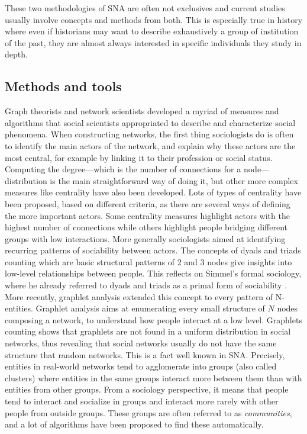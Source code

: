 These two methodologies of SNA are often not exclusives and current studies usually involve concepts and methods from both.
This is especially true in history where even if historians may want to describe exhaustively a group of institution of the past, they are almost always interested in specific individuals they study in depth.

\subsection{Methods and tools}\label{subsec:methods-dans-tools}

Graph theorists and network scientists developed a myriad of measures and algorithms that social scientists appropriated to describe and characterize social phenomena.
When constructing networks, the first thing sociologists do is often to identify the main actors of the network, and explain why these actors are the most central, for example by linking it to their profession or social status.
Computing the degree---which is the number of connections for a node---distribution is the main straightforward way of doing it, but other more complex measures like centrality have also been developed.
Lots of types of centrality have been proposed, based on different criteria, as there are several ways of defining the more important actors.
Some centrality measures highlight actors with the highest number of connections while others highlight people bridging different groups with low interactions.
More generally sociologists aimed at identifying recurring patterns of sociability between actors.
The concepts of dyads and triads counting which are basic structural patterns of 2 and 3 nodes give insights into low-level relationships between people.
This reflects on Simmel's formal sociology, where he already referred to dyads and triads as a primal form of sociability \cite{Simmel2013}.
More recently, graphlet analysis extended this concept to every pattern of N-entities.
Graphlet analysis aims at enumerating every small structure of $N$ nodes composing a network, to understand how people interact at a low level.
Graphlets counting shows that graphlets are not found in a uniform distribution in social networks, thus revealing that social networks usually do not have the same structure that random networks.
This is a fact well known in SNA. Precisely, entities in real-world networks tend to agglomerate into groups (also called clusters) where entities in the same groups interact more between them than with entities from other groups.
From a sociology perspective, it means that people tend to interact and socialize in groups and interact more rarely with other people from outside groups.
These groups are often referred to as \emph{communities}, and a lot of algorithms have been proposed to find these automatically.

